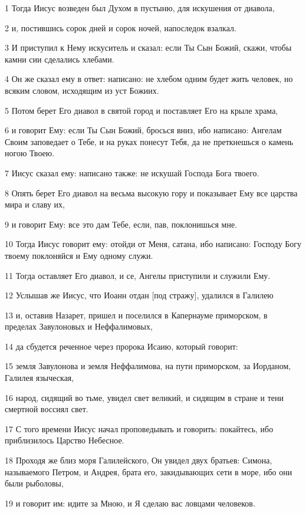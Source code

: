 \par 1 Тогда Иисус возведен был Духом в пустыню, для искушения от диавола,
\par 2 и, постившись сорок дней и сорок ночей, напоследок взалкал.
\par 3 И приступил к Нему искуситель и сказал: если Ты Сын Божий, скажи, чтобы камни сии сделались хлебами.
\par 4 Он же сказал ему в ответ: написано: не хлебом одним будет жить человек, но всяким словом, исходящим из уст Божиих.
\par 5 Потом берет Его диавол в святой город и поставляет Его на крыле храма,
\par 6 и говорит Ему: если Ты Сын Божий, бросься вниз, ибо написано: Ангелам Своим заповедает о Тебе, и на руках понесут Тебя, да не преткнешься о камень ногою Твоею.
\par 7 Иисус сказал ему: написано также: не искушай Господа Бога твоего.
\par 8 Опять берет Его диавол на весьма высокую гору и показывает Ему все царства мира и славу их,
\par 9 и говорит Ему: все это дам Тебе, если, пав, поклонишься мне.
\par 10 Тогда Иисус говорит ему: отойди от Меня, сатана, ибо написано: Господу Богу твоему поклоняйся и Ему одному служи.
\par 11 Тогда оставляет Его диавол, и се, Ангелы приступили и служили Ему.
\par 12 Услышав же Иисус, что Иоанн отдан [под стражу], удалился в Галилею
\par 13 и, оставив Назарет, пришел и поселился в Капернауме приморском, в пределах Завулоновых и Неффалимовых,
\par 14 да сбудется реченное через пророка Исаию, который говорит:
\par 15 земля Завулонова и земля Неффалимова, на пути приморском, за Иорданом, Галилея языческая,
\par 16 народ, сидящий во тьме, увидел свет великий, и сидящим в стране и тени смертной воссиял свет.
\par 17 С того времени Иисус начал проповедывать и говорить: покайтесь, ибо приблизилось Царство Небесное.
\par 18 Проходя же близ моря Галилейского, Он увидел двух братьев: Симона, называемого Петром, и Андрея, брата его, закидывающих сети в море, ибо они были рыболовы,
\par 19 и говорит им: идите за Мною, и Я сделаю вас ловцами человеков.
